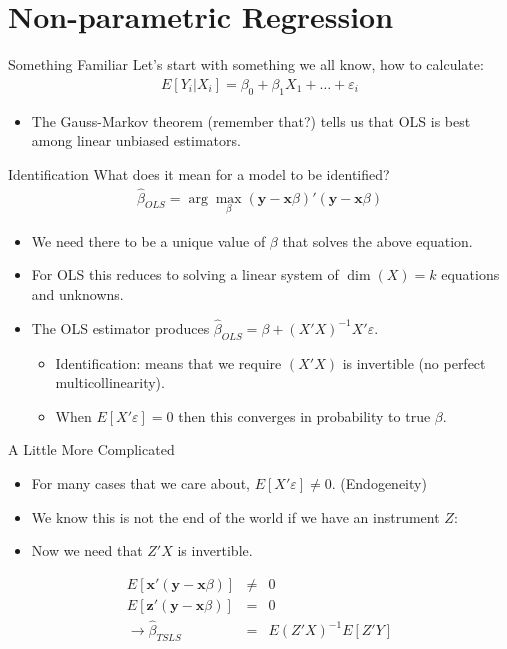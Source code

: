 \section{Non-parametric Regression}

\begin{frame}{Something Familiar}
  Let's start with something we all know, how to calculate:
  \begin{eqnarray*}
  E[Y_i | X_i ] = \beta_0 + \beta_1 X_1 + \ldots + \varepsilon_i
  \end{eqnarray*}
  \begin{itemize}
  \item The Gauss-Markov theorem (remember that?) tells us that OLS is best among linear unbiased estimators.
  \end{itemize}
\end{frame}

\begin{frame}{Identification}
  What does it mean for a model to be identified?
  \begin{eqnarray*}
  \hat{\beta}_{OLS} = \arg \max_{\beta} (\mathbf{y} - \mathbf{x} \beta)' (\mathbf{y} - \mathbf{x} \beta)
  \end{eqnarray*}
  \begin{itemize}
  \item We need there to be a unique value of $\beta$ that solves the above equation.
  \item For OLS this reduces to solving a linear system of $\dim(X)=k$ equations and unknowns.
  \item The OLS estimator produces $\hat{\beta}_{OLS} = \beta + (X'X)^{-1}X'\varepsilon$.
  \begin{itemize}
  \item Identification: means that we require $(X'X)$ is invertible (no perfect multicollinearity).
  \item When $E[X' \varepsilon ] =0$ then this converges in probability to true $\beta$.
  \end{itemize}

  \end{itemize}
\end{frame}

\begin{frame}{A Little More Complicated}
\begin{itemize}
\item For many cases that we care about, $E[X' \varepsilon ] \neq 0$. (Endogeneity)
\item We know this is not the end of the world if we have an instrument $Z$:
\item Now we need that $Z'X$ is invertible.
\end{itemize}
\begin{eqnarray*}
E[\mathbf{x}' (\mathbf{y} - \mathbf{x} \beta)] &\neq& 0\\
E[\mathbf{z}' (\mathbf{y} - \mathbf{x} \beta)] &=&0\\
\rightarrow \hat{\beta}_{TSLS} &=& E(Z'X)^{-1} E[Z'Y]
\end{eqnarray*}
\end{frame}


